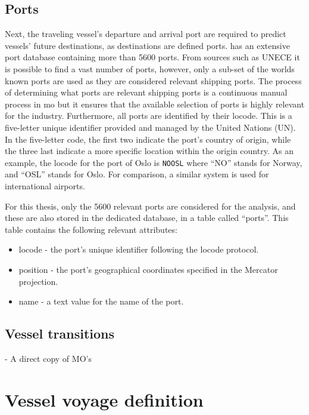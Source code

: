 \subsection{Ports}

Next, the traveling vessel's departure and arrival port are required to predict vessels' future destinations, as destinations are defined ports.  has an extensive port database containing more than 5600 ports. From sources such as UNECE it is possible to find a vast number of ports, however, only a sub-set of the worlds known ports are used as they are considered relevant shipping ports. The process of determining what ports are relevant shipping ports is a continuous manual process in \acrshort{mo} but it ensures that the available selection of ports is highly relevant for the industry. Furthermore, all ports are identified by their \gls{locode}. This is a five-letter unique identifier provided and managed by the United Nations (UN). In the five-letter code, the first two indicate the port's country of origin, while the three last indicate a more specific location within the origin country. As an example, the \gls{locode} for the port of Oslo is \texttt{NOOSL} where ``NO'' stands for Norway, and ``OSL'' stands for Oslo. For comparison, a similar system is used for international airports.

For this thesis, only the 5600 relevant ports are considered for the analysis, and these are also stored in the dedicated database, in a table called ``ports''. This table contains the following relevant attributes:

\begin{itemize}
    \item locode - the port's unique identifier following the \gls{locode} protocol.
    \item position - the port's geographical coordinates specified in the Mercator projection.
    \item name - a text value for the name of the port.
\end{itemize}

\subsection{Vessel transitions}

 - A direct copy of MO's

\section{Vessel voyage definition}

